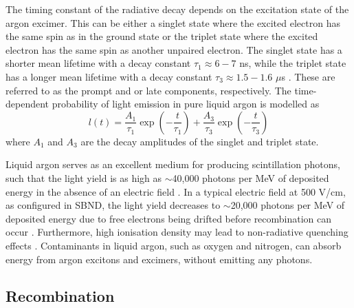 The timing constant of the radiative decay depends on the excitation state of the argon excimer.
This can be either a singlet state where the excited electron has the same spin as in the ground state or the triplet state where the excited electron has the same spin as another unpaired electron.
The singlet state has a shorter mean lifetime with a decay constant $\tau_{1} \approx 6 - 7$ ns, while the triplet state has a longer mean lifetime with a decay constant $\tau_{3} \approx 1.5 - 1.6$ 
$\mu$s \cite{photon_lifetime}.
These are referred to as the prompt and or late components, respectively. 
The time-dependent probability of light emission in pure liquid argon is modelled as
\begin{equation}
        l(t)=\frac{A_{1}}{\tau_{1}}\exp{\left(-\frac{t}{\tau_{1}}\right)} +\frac{A_{3}}{\tau_{3}}\exp{\left(-\frac{t}{\tau_{3}}\right)}
\end{equation}
where $A_{1}$ and $A_{3}$ are the decay amplitudes of the singlet and triplet state.

Liquid argon serves as an excellent medium for producing scintillation photons, such that the light yield is as high as $\sim$40,000 photons per MeV of deposited energy in the absence of an electric field \cite{light_yield}.
In a typical electric field at 500 V/cm, as configured in SBND, the light yield decreases to $\sim$20,000 photons per MeV of deposited energy due to free electrons being drifted before recombination can occur \cite{light_yield_Efield}.
Furthermore, high ionisation density may lead to non-radiative quenching effects \cite{Lariat}.
Contaminants in liquid argon, such as oxygen and nitrogen, can absorb energy from argon excitons and excimers, without emitting any photons.
 
\subsection{Recombination}
\label{sec:recomb}

